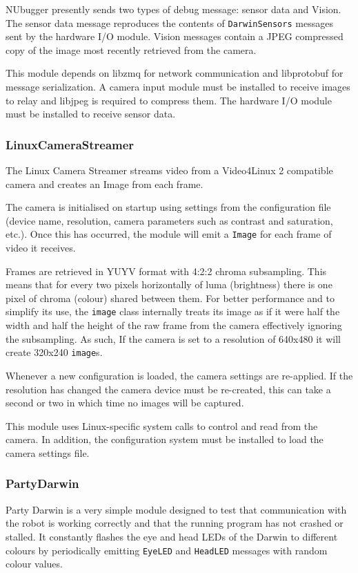 \documentclass[english,12pt]{scrartcl}
\begin{document}
				NUbugger presently sends two types of debug message: sensor data and Vision.
				The sensor data message reproduces the contents of \texttt{DarwinSensors}
				messages sent by the hardware I/O module. Vision messages contain a JPEG
				compressed copy of the image most recently retrieved from the camera.

				This module depends on libzmq for network communication and libprotobuf for
				message serialization. A camera input module must be installed to receive
				images to relay and libjpeg is required to compress them. The hardware I/O
				module must be installed to receive sensor data.


			\subsubsection{LinuxCameraStreamer}
				The Linux Camera Streamer streams video from a Video4Linux 2 compatible camera and
				creates an Image from each frame.

				The camera is initialised on startup using settings from the configuration
				file (device name, resolution, camera parameters such as contrast and
				saturation, etc.). Once this has occurred, the module will emit a
				\texttt{Image} for each frame of video it receives.

				Frames are retrieved in YUYV format with 4:2:2 chroma subsampling. This means
				that for every two pixels horizontally of luma (brightness) there is one pixel
				of chroma (colour) shared between them. For better performance and to simplify
				its use, the \texttt{image} class internally treats its image as if it were half
				the width and half the height of the raw frame from the camera effectively
				ignoring the subsampling. As such, If the camera is set to a resolution of
				640x480 it will create 320x240 \texttt{image}s.

				Whenever a new configuration is loaded, the camera settings are re-applied. If
				the resolution has changed the camera device must be re-created, this can take
				a second or two in which time no images will be captured.

				This module uses Linux-specific system calls to control and read from the camera.
				In addition, the configuration system must be installed to load the camera settings file.


			\subsubsection{PartyDarwin}
				Party Darwin is a very simple module designed to test that communication with the
				robot is working correctly and that the running program has not crashed or
				stalled. It constantly flashes the eye and head LEDs of the Darwin to different
				colours by periodically emitting \texttt{EyeLED} and \texttt{HeadLED} messages
				with random colour values.
\end{document}
